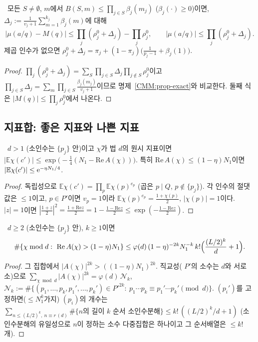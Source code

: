 \begin{corollary}[곱셈적 형태]\label{CMM:cor-mult}
\PROVED\ 모든 $S\ne\emptyset$, $m$에서 $B(S,m)\le\prod_{j\in S}\beta_j(m_j)$ ($\beta_j(\cdot)\ge0$)이면,
$\Delta_j:=\frac1{v_j+1}\sum_{m=1}^{k_j}\beta_j(m)$에 대해
\[
|\mu(a/q)-M(q)|\le\prod_j(\rho^0_j+\Delta_j)-\prod_j\rho^0_j,\qquad |\mu(a/q)|\le\prod_j(\rho^0_j+\Delta_j).
\]
제곱 인수가 없으면 $\rho^0_j+\Delta_j=\pi_j+(1-\pi_j)\bigl(\frac1{p_j-1}+\beta_j(1)\bigr)$.
\end{corollary}
\begin{proof}
$\prod_j(\rho^0_j+\Delta_j)=\sum_S\prod_{j\in S}\Delta_j\prod_{j\notin S}\rho^0_j$이고 $\prod_{j\in S}\Delta_j=\sum_m\prod_{j\in S}\frac{\beta_j(m_j)}{v_j+1}$이므로 명제~\ref{CMM:prop-exact}와 비교한다.
둘째 식은 $|M(q)|\le\prod_j\rho^0_j$에서 나온다.
\end{proof}

\subsection{지표합: 좋은 지표와 나쁜 지표}\label{CMM:ssec-char}

\begin{lemma}[좋은 지표]\label{CMM:lem-good}
\PROVED\ $d>1$ (소인수는 $\{p_j\}$ 안)이고 $\chi$가 법 $d$의 원시 지표이면
$|\mathbb E\chi(c')|\le\exp\bigl(-\tfrac14(N_1-\mathrm{Re}\,A(\chi))\bigr)$. 특히 $\mathrm{Re}\,A(\chi)\le(1-\eta)N_1$이면 $|\mathbb E\chi(c')|\le\mathrm{e}^{-\eta N_1/4}$.
\end{lemma}
\begin{proof}
독립성으로 $\mathbb E\chi(c')=\prod_{p}\mathbb E\chi(p)^{e_p}$ (곱은 $p\mid Q$, $p\notin\{p_j\}$). 각 인수의 절댓값은 $\le1$이고,
$p\in P'$이면 $v_p=1$이라 $\mathbb E\chi(p)^{e_p}=\frac{1+\chi(p)}2$, $|\chi(p)|=1$이다.
$|z|=1$이면 $|\frac{1+z}2|^2=\frac{1+\mathrm{Re}z}2=1-\frac{1-\mathrm{Re}z}{2}\le\exp(-\frac{1-\mathrm{Re}z}2)$.
\end{proof}

\begin{lemma}[$2k$차 모멘트]\label{CMM:lem-moment}
\PROVED\ $d\ge2$ (소인수는 $\{p_j\}$ 안), $k\ge1$이면
\[
\#\{\chi\bmod d:\ \mathrm{Re}\,A(\chi)>(1-\eta)N_1\}\le\varphi(d)\,(1-\eta)^{-2k}N_1^{-k}\,k!\Bigl(\frac{(L/2)^k}{d}+1\Bigr).
\]
\end{lemma}
\begin{proof}
그 집합에서 $|A(\chi)|^{2k}>((1-\eta)N_1)^{2k}$. 직교성( $P'$의 소수는 $d$와 서로소)으로
$\sum_{\chi\bmod d}|A(\chi)|^{2k}=\varphi(d)\,\mathcal N_k$,
$\mathcal N_k:=\#\{(p_1,\dots,p_k,p_1',\dots,p_k')\in P'^{2k}:\ p_1\cdots p_k\equiv p_1'\cdots p_k'\pmod d\}$.
$(p_i')$를 고정하면(${}\le N_1^k$가지) $(p_i)$의 개수는 $\sum_{n\le(L/2)^k,\ n\equiv r\,(d)}\#\{n\text{의 길이 }k\text{ 순서 소인수분해}\}\le k!\,((L/2)^k/d+1)$
(소인수분해의 유일성으로 $n$이 정하는 소수 다중집합은 하나이고 그 순서배열은 $\le k!$개).
\end{proof}

